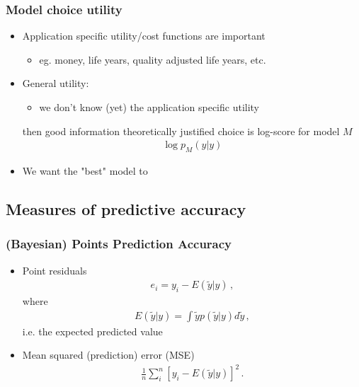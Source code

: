 \documentclass[10pt]{beamer}
\begin{document}
\begin{frame}

\frametitle{Model choice utility}
  \begin{itemize}
  \item Application specific utility/cost functions are important
    \begin{itemize}
      \item eg. money, life years, quality adjusted life years, etc.
    \end{itemize}
  \pause
  \item General utility: 
  \begin{itemize}
    \item we don't know (yet) the application specific utility
  \end{itemize}
    then good information theoretically justified choice is log-score for model $M$
      \begin{align*}
        \log p_M (y | y)
      \end{align*}
    \pause
    \item We want the "best" model to 
\end{itemize}

\end{frame}

\subsection{Measures of predictive accuracy}
\frame{\subsectionpage}

\begin{frame}

\frametitle{(Bayesian) Points Prediction Accuracy}

    \begin{itemize}
      \item Point residuals
      \begin{align*}
        e_i =  y_i - E(\tilde{y}|y)\,,
      \end{align*}
      where
      \begin{align*}
        E(\tilde{y}|y) = \int \tilde{y} p(\tilde{y}|y) d\tilde{y}\,,
      \end{align*}
      i.e. the expected predicted value
      \pause
      \item Mean squared (prediction) error (MSE)
      \begin{align*}
        \frac{1}{n}\sum^n_i [y_i - E(\tilde{y}|y)]^2 \,.
      \end{align*}
    \end{itemize}

\end{frame}
\end{document}
